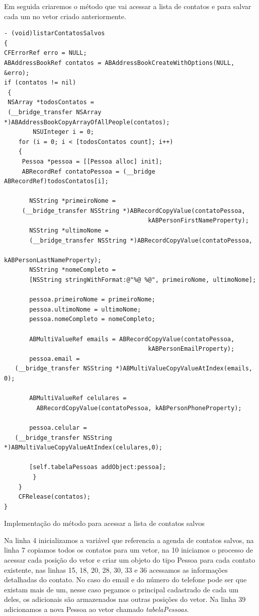 \documentclass[a4paper,12pt,brazil,doubleside]{book}
\begin{document}
\begin{singlespace}
Em seguida criaremos o método que vai acessar a lista de contatos e para salvar cada um no vetor criado anteriormente.

\begin{listing}[H]
\begin{verbatim}
- (void)listarContatosSalvos
{
CFErrorRef erro = NULL;
ABAddressBookRef contatos = ABAddressBookCreateWithOptions(NULL, &erro);
if (contatos != nil)
 {
 NSArray *todosContatos = 
 (__bridge_transfer NSArray *)ABAddressBookCopyArrayOfAllPeople(contatos);
        NSUInteger i = 0;
    for (i = 0; i < [todosContatos count]; i++)
    {
     Pessoa *pessoa = [[Pessoa alloc] init];
     ABRecordRef contatoPessoa = (__bridge ABRecordRef)todosContatos[i];
            
       NSString *primeiroNome = 
 	 (__bridge_transfer NSString *)ABRecordCopyValue(contatoPessoa, 
	      								kABPersonFirstNameProperty);
       NSString *ultimoNome =  
       (__bridge_transfer NSString *)ABRecordCopyValue(contatoPessoa, 
            								kABPersonLastNameProperty);
       NSString *nomeCompleto = 
       [NSString stringWithFormat:@"%@ %@", primeiroNome, ultimoNome];
            
       pessoa.primeiroNome = primeiroNome;
       pessoa.ultimoNome = ultimoNome;
       pessoa.nomeCompleto = nomeCompleto;
            
       ABMultiValueRef emails = ABRecordCopyValue(contatoPessoa, 
         								kABPersonEmailProperty);
       pessoa.email = 
   (__bridge_transfer NSString *)ABMultiValueCopyValueAtIndex(emails, 0);
            
       ABMultiValueRef celulares = 
      	 ABRecordCopyValue(contatoPessoa, kABPersonPhoneProperty);
			
       pessoa.celular = 
   (__bridge_transfer NSString *)ABMultiValueCopyValueAtIndex(celulares,0);
            
       [self.tabelaPessoas addObject:pessoa];   
        }
    }
    CFRelease(contatos);
}
\end{verbatim}
\caption{Implementação do método para acessar a lista de contatos salvos}
\end{listing}

Na linha 4 inicializamos a variável que referencia a agenda de contatos salvos, na linha 7 copiamos todos os contatos para um vetor, na 10 iniciamos o processo de acessar cada posição do vetor e criar um objeto do tipo Pessoa para cada contato existente, nas linhas 15, 18, 20, 28, 30, 33 e 36 acessamos as informações detalhadas do contato.
No caso do email e do número do telefone pode ser que existam mais de um, nesse caso pegamos o principal cadastrado de cada um deles, os adicionais são armazenados nas outras posições do vetor.
Na linha 39 adicionamos a nova Pessoa ao vetor chamado \emph{tabelaPessoas}.


\end{singlespace}
\end{document}
